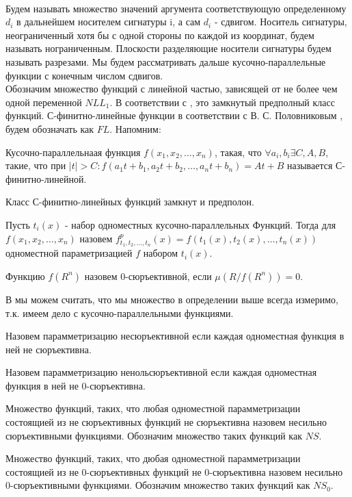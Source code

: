 \documentclass[main.tex]{subfiles}
\begin{document}
\\
Будем называть множество значений аргумента соответствующую определенному
$d_i$ в дальнейшем носителем сигнатуры i, а сам $d_i$ - сдвигом.
Носитель сигнатуры, неограниченный хотя бы с одной стороны по каждой из координат, будем называть нограниченным.
Плоскости разделяющие носители сигнатуры будем называть разрезами.
Мы будем рассматривать дальше кусочно-параллельные функции с конечным числом сдвигов.\\
Обозначим множество функций с линейной частью, зависящей от не более чем одной переменной $NLL_1$.
В соответствии с \cite{Otro1}, это замкнутый предполный класс функций.
С-финитно-линейные функции в соответствии с В. С. Половниковым \cite{Polov1},
будем обозначать как $FL$. Напомним:
\begin{definition}
  Кусочно-параллельнаая функция $f(x_1, x_2, \ldots, x_n)$, такая, что $\forall a_i, b_i \exists C, A, B$, такие, что при
  $|t| > C: f(a_1 t + b_1, a_2 t + b_2, \ldots, a_n t + b_n) = A t + B$ называется С-финитно-линейной.
\end{definition}
Класс С-финитно-линейных функций замкнут и предполон.
\begin{definition}
  Пусть $t_i(x)$ - набор одноместных кусочно-параллельных Функций. 
  Тогда для $f(x_1, x_2, \ldots, x_n)$ назовем $f^{p}_{t_1, t_2, \ldots, t_n}(x) = f(t_1(x), t_2(x), \ldots, t_n(x))$
  одноместной параметризацией $f$ набором $t_i(x)$.
\end{definition}
\begin{definition}
  Функцию $f(R^n)$ назовем 0-сюръективной, если $\mu(R / f(R^n)) = 0$.
\end{definition}
    В мы можем считать, что мы множество в определении выше всегда измеримо, т.к. имеем дело с кусочно-параллельными функциями. 

    \begin{definition}
      Назовем парамметризацию несюръективной если каждая одноместная функция в ней не сюръективна.
    \end{definition}

    \begin{definition}
      Назовем парамметризацию ненольсюръективной если каждая одноместная функция в ней не 0-сюръективна.
    \end{definition}
\begin{definition}
Множество функций, таких, что любая одноместной парамметризации состоящией из не сюръективных функций не сюръективна назовем несильно сюръективными функциями. Обозначим множество таких функций как $NS$.
\end{definition}
\begin{definition}
Множество функций, таких, что дюбая одноместной парамметризации состоящией из не 0-сюръективных функций не 0-сюръективна назовем несильно 0-сюръективными функциями. Обозначим множество таких функций как $NS_0$.
\end{definition}
\end{document}
